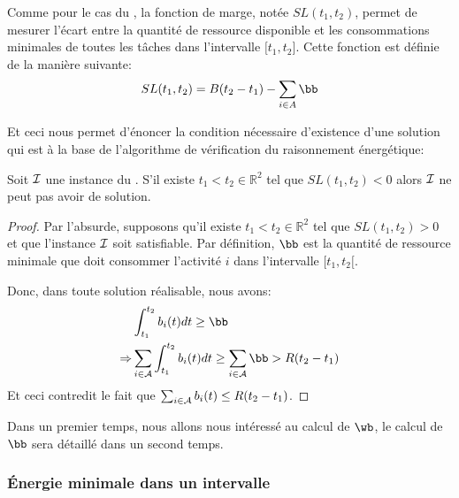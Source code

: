 Comme pour le cas du \CUSP, la fonction de marge, notée $SL(t_1,t_2)$,
permet de mesurer l'écart entre la quantité de ressource disponible et
les consommations minimales de toutes les tâches dans l'intervalle
${[}t_1,t_2{]}$. Cette fonction est définie de la manière suivante:
\[ SL(t_1,t_2)=B(t_2-t_1)-\sum\limits_{i \in A} \bb \]

Et ceci nous permet d'énoncer la condition nécessaire d'existence
d'une solution qui est à la base de l'algorithme de vérification du
raisonnement énergétique:

\begin{theo}
  \label{th:ER_CECSP}
  Soit ${\cal I}$ une instance du \CECSP. S'il existe $t_1 < t_2 \in
  \mathbb{R}^2$ tel que $SL(t_1,t_2) <0$ alors ${\cal I}$ ne peut pas avoir
  de solution.
\end{theo}

\begin{proof}
Par l'absurde, supposons qu'il existe $t_1 < t_2 \in \mathbb{R}^2$ tel
que $SL(t_1,t_2) > 0$ et que l'instance ${\cal I}$ soit satisfiable. Par
définition, $\bb$ est la quantité de ressource minimale que doit
consommer l'activité $i$ dans l'intervalle $[t_1,t_2{[}$. 

Donc, dans toute solution réalisable, nous avons: 
\begin{align*}
 & \int_{t_1}^{t_2} b_i(t)dt \ge \bb\\
\Rightarrow  & \sum_{i \in \A} \int_{t_1}^{t_2} b_i(t)dt \ge \sum_{i
               \in \A}  \bb > R(t_2-t_1)
\end{align*}
Et ceci contredit le fait que $\sum_{i \in {\cal A}} b_i(t) \le
R(t_2-t_1)$. 
\end{proof}

Dans un premier temps, nous allons nous intéressé au calcul de $\wb$,
le calcul de $\bb$ sera détaillé dans un second temps. 


\subsubsection{{\'E}nergie minimale dans un intervalle}

